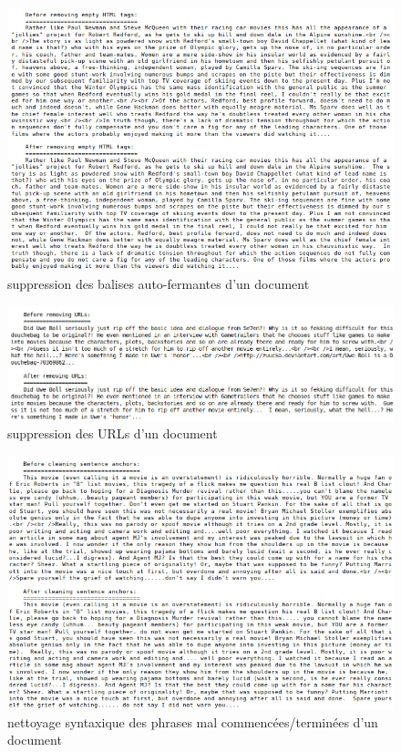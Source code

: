\documentclass[12pt,a4paper]{report}
\theoremstyle{definition}
\begin{document}
\begin{appendices}
\begin{figure}[!ht]
  \centering
  \includegraphics[scale=0.6]{images/snapshots/preprocessing/remove_empty_html_tags.png}
  \caption{suppression des balises auto-fermantes d'un document}
  \label{fig:remove_empty_html_tags}
\end{figure}

\begin{figure}[!ht]
  \centering
  \includegraphics[scale=0.45]{images/snapshots/preprocessing/remove_urls.png}
  \caption{suppression des URLs d'un document}
  \label{fig:remove_urls}
\end{figure}

\begin{figure}[!ht]
  \centering
  \includegraphics[scale=0.6]{images/snapshots/preprocessing/clean_sentence_anchors.png}
  \caption{nettoyage syntaxique des phrases mal commencées/terminées d'un document}
  \label{fig:clean_sentence_anchors}
\end{figure}


\end{appendices}
\end{document}
